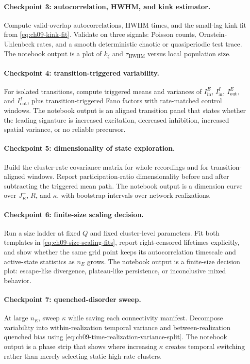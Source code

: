 \paragraph{Checkpoint 3: autocorrelation, HWHM, and kink estimator.}
Compute valid-overlap autocorrelations, HWHM times, and the small-lag kink fit
from \eqref{eq:ch09-kink-fit}. Validate on three signals: Poisson counts,
Ornstein-Uhlenbeck rates, and a smooth deterministic chaotic or quasiperiodic
test trace. The notebook output is a plot of \(k_\xi\) and
\(\tau_{\mathrm{HWHM}}\) versus local population size.

\paragraph{Checkpoint 4: transition-triggered variability.}
For isolated transitions, compute triggered means and variances of
\(I_{\mathrm{in}}^E\), \(I_{\mathrm{in}}^I\), \(I_{\mathrm{out}}^E\), and
\(I_{\mathrm{out}}^I\), plus transition-triggered Fano factors with
rate-matched control windows. The notebook output is an aligned transition
panel that states whether the leading signature is increased excitation,
decreased inhibition, increased spatial variance, or no reliable precursor.

\paragraph{Checkpoint 5: dimensionality of state exploration.}
Build the cluster-rate covariance matrix for whole recordings and for
transition-aligned windows. Report participation-ratio dimensionality before
and after subtracting the triggered mean path. The notebook output is a
dimension curve over \(J_E^+\), \(R\), and \(\kappa\), with bootstrap intervals
over network realizations.

\paragraph{Checkpoint 6: finite-size scaling decision.}
Run a size ladder at fixed \(Q\) and fixed cluster-level parameters. Fit both
templates in \eqref{eq:ch09-size-scaling-fits}, report right-censored lifetimes
explicitly, and show whether the same grid point keeps its autocorrelation
timescale and active-state statistics as \(n_E\) grows. The notebook output is
a finite-size decision plot: escape-like divergence, plateau-like persistence,
or inconclusive mixed behavior.

\paragraph{Checkpoint 7: quenched-disorder sweep.}
At large \(n_E\), sweep \(\kappa\) while saving each connectivity manifest.
Decompose variability into within-realization temporal variance and
between-realization quenched bias using
\eqref{eq:ch09-time-realization-variance-split}. The notebook output is a
phase strip that shows where increasing \(\kappa\) creates temporal switching
rather than merely selecting static high-rate clusters.

